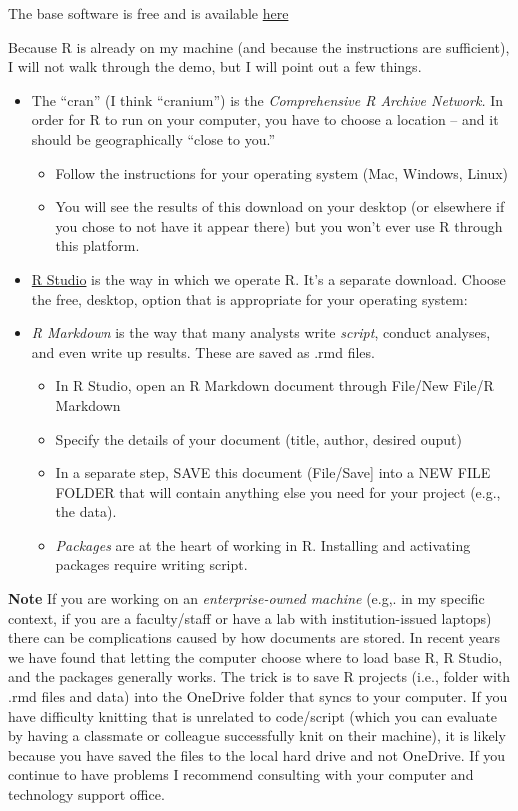 \documentclass[
  11pt,
]{book}
\providecommand{\tightlist}{%
  \setlength{\itemsep}{0pt}\setlength{\parskip}{0pt}}
\begin{document}
The base software is free and is available \href{https://www.r-project.org/}{here}

Because R is already on my machine (and because the instructions are sufficient), I will not walk through the demo, but I will point out a few things.

\begin{itemize}
\tightlist
\item
  The ``cran'' (I think ``cranium'') is the \emph{Comprehensive R Archive Network.} In order for R to run on your computer, you have to choose a location -- and it should be geographically ``close to you.''

  \begin{itemize}
  \tightlist
  \item
    Follow the instructions for your operating system (Mac, Windows, Linux)
  \item
    You will see the results of this download on your desktop (or elsewhere if you chose to not have it appear there) but you won't ever use R through this platform.
  \end{itemize}
\item
  \href{https://www.rstudio.com/products/RStudio/}{R Studio} is the way in which we operate R. It's a separate download. Choose the free, desktop, option that is appropriate for your operating system:\\
\item
  \emph{R Markdown} is the way that many analysts write \emph{script}, conduct analyses, and even write up results. These are saved as .rmd files.

  \begin{itemize}
  \tightlist
  \item
    In R Studio, open an R Markdown document through File/New File/R Markdown
  \item
    Specify the details of your document (title, author, desired ouput)
  \item
    In a separate step, SAVE this document (File/Save{]} into a NEW FILE FOLDER that will contain anything else you need for your project (e.g., the data).
  \item
    \emph{Packages} are at the heart of working in R. Installing and activating packages require writing script.
  \end{itemize}
\end{itemize}

\textbf{Note} If you are working on an \emph{enterprise-owned machine} (e.g,. in my specific context, if you are a faculty/staff or have a lab with institution-issued laptops) there can be complications caused by how documents are stored. In recent years we have found that letting the computer choose where to load base R, R Studio, and the packages generally works. The trick is to save R projects (i.e., folder with .rmd files and data) into the OneDrive folder that syncs to your computer. If you have difficulty knitting that is unrelated to code/script (which you can evaluate by having a classmate or colleague successfully knit on their machine), it is likely because you have saved the files to the local hard drive and not OneDrive. If you continue to have problems I recommend consulting with your computer and technology support office.
\end{document}
